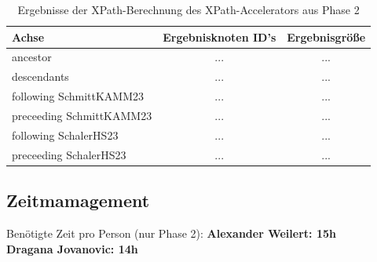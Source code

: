 \documentclass[11pt]{scrartcl}
\begin{document}
\begin{table}[h]
	\centering
		\begin{center}
			\begin{tabular}{ l | c c }
				\toprule
				Achse & Ergebnisknoten ID's & Ergebnisgröße\\
				\midrule
				ancestor & ... & ... \\ 
				descendants & ... & ... \\  
				following SchmittKAMM23& ... & ... \\
				preceeding SchmittKAMM23 & ... & ... \\
				following SchalerHS23& ... & ... \\  
				preceeding SchalerHS23& ... & ... \\ 
				\bottomrule
			\end{tabular}
			\end{center}
	\caption{Ergebnisse der XPath-Berechnung des XPath-Accelerators aus Phase 2}
	\label{tab:ErgebnisseDerXPathBerechnug1}
\end{table}

\subsection*{Zeitmamagement}

Benötigte Zeit pro Person (nur Phase 2):
\textbf{Alexander Weilert: 15h} \\
\textbf{Dragana Jovanovic: 14h}
\end{document}
